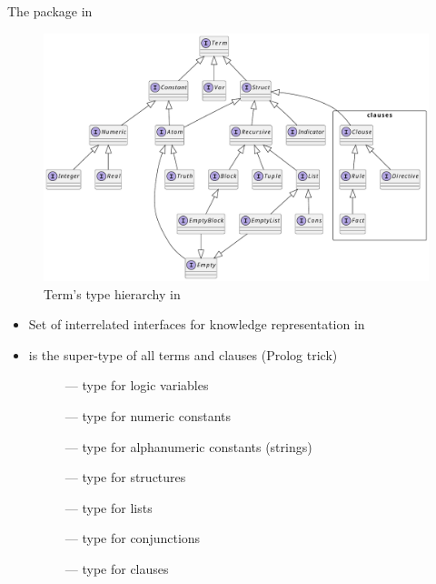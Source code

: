 \documentclass[presentation]{beamer}\mode<presentation>{\usetheme{AMSBolognaFC}}
\begin{document}
\begin{frame}[allowframebreaks]{The  package in }
    \begin{figure}
        \centering
        \includegraphics[width=.7\linewidth]{figures/term-hierarchy.pdf}
        \caption{Term's type hierarchy in \twopkt{}}
        \label{fig:term-hierarchy}
    \end{figure}

    \framebreak

    \begin{itemize}
        \item Set of interrelated interfaces for knowledge representation in \twopkt{}

        \bigskip

        \item {} is the super-type of all terms and \alert{clauses} (Prolog trick)
        \begin{description}
            \item[] --- type for logic variables
            \item[] --- type for numeric constants
            \item[] --- type for alphanumeric constants (strings)
            \item[] --- type for structures
            \item[] --- type for lists
            \item[] --- type for conjunctions
            \item[] --- type for clauses
        \end{description}

        \framebreak


\end{itemize}
\end{frame}
\end{document}
